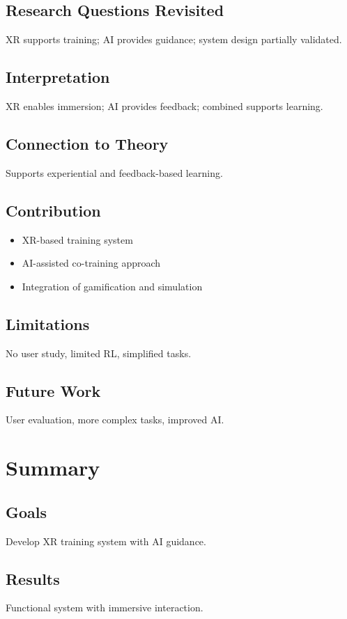 \documentclass[12pt]{article}
\begin{document}
\subsection{Research Questions Revisited}
XR supports training; AI provides guidance; system design partially validated.

\subsection{Interpretation}
XR enables immersion; AI provides feedback; combined supports learning.

\subsection{Connection to Theory}
Supports experiential and feedback-based learning.

\subsection{Contribution}
\begin{itemize}
    \item XR-based training system
    \item AI-assisted co-training approach
    \item Integration of gamification and simulation
\end{itemize}

\subsection{Limitations}
No user study, limited RL, simplified tasks.

\subsection{Future Work}
User evaluation, more complex tasks, improved AI.

\newpage
\section{Summary}

\subsection{Goals}
Develop XR training system with AI guidance.

\subsection{Results}
Functional system with immersive interaction.
\end{document}
